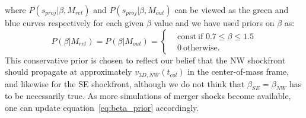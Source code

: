 where $P(s_{proj} | \beta, M_{ret})$ and $P(s_{proj} | \beta, M_{out})$ can be
viewed as the green and blue curves respectively for each given $\beta$ value and we
have used priors on $\beta$ as: 
\begin{equation}
	\label{eq:beta_prior}
	P(\beta | M_{ret}) = P(\beta | M_{out}) =  
	\begin{cases}
		& \text{const}~\text{if } 0.7 \leq \beta \leq 1.5 \\
		& 0~\text{otherwise}.
	\end{cases}
\end{equation}
This conservative prior is chosen to reflect our belief that the
NW shockfront should propagate at approximately $v_{3D, NW}(t_{col})$ in the
center-of-mass frame, and likewise for the SE shockfront, although we do
not think that $\beta_{SE} = \beta_{NW}$ has to be necessarily true. 
As more simulations of merger shocks become available, one can update equation~\ref{eq:beta_prior} accordingly.


\bsp 
\label{lastpage} 

